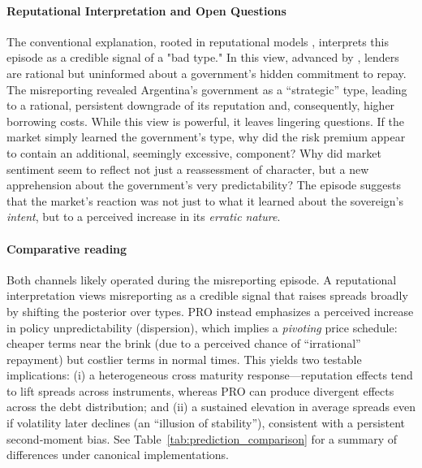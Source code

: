 \documentclass[12pt]{article}
\theoremstyle{plain}
\begin{document}
\paragraph{Reputational Interpretation and Open Questions}
The conventional explanation, rooted in reputational models
\citep{ColeDowEnglish1995}, interprets this episode as a credible signal of a
"bad type." In this view, advanced by \citep{MorelliMoretti2023}, lenders are
rational but uninformed about a government's hidden commitment to repay. The
misreporting revealed Argentina's government as a ``strategic'' type, leading
to a rational, persistent downgrade of its reputation and, consequently, higher
borrowing costs. While this view is powerful, it leaves lingering questions. If
the market simply learned the government's type, why did the risk premium
appear to contain an additional, seemingly excessive, component? Why did market
sentiment seem to reflect not just a reassessment of character, but a new
apprehension about the government's very predictability? The episode suggests
that the market's reaction was not just to what it learned about the
sovereign's \textit{intent}, but to a perceived increase in its \textit{erratic
	nature}.

\paragraph{Comparative reading} Both channels likely operated during the misreporting episode. A reputational
interpretation views misreporting as a credible signal that raises spreads
broadly by shifting the posterior over types. PRO instead emphasizes a
perceived increase in policy unpredictability (dispersion), which implies a
\emph{pivoting} price schedule: cheaper terms near the brink (due to a
perceived chance of “irrational” repayment) but costlier terms in normal times.
This yields two testable implications: (i) a heterogeneous cross maturity
response—reputation effects tend to lift spreads across instruments, whereas
PRO can produce divergent effects across the debt distribution; and (ii) a
sustained elevation in average spreads even if volatility later declines (an
“illusion of stability”), consistent with a persistent second‑moment bias. See
Table~\ref{tab:prediction_comparison} for a summary of differences under
canonical implementations.
\end{document}
